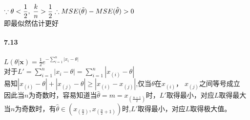 \documentclass[11pt,a4paper]{ctexart}
\newcommand{\bx}[0]{\mathbf{x}}
\begin{document}
\(\displaystyle \because \theta < \frac{1}{2} , \; \frac{k}{n} > \frac{1}{2} \\
 \therefore MSE(\tilde{\theta}) - MSE(\hat{\theta}) > 0\)\\
 即最似然估计更好
\paragraph{7.13}
\(L(\theta|\bx) = \frac{1}{2}e^{-\sum_{i = 1}^{n}|x_i - \theta|}\)\\
对于\(L' = \sum_{i = 1}^{n}|x_i - \theta| = \sum_{i = 1}^{n}|x_{(i)} - \theta|\)\\
易知\(|x_{(i)} - \theta| + |x_{(j)} - \theta| \geq |x_{(i)} - x_{(j)}|\),仅当\(\theta \text{在} x_{(i)}， \; x_{(j)}\)之间等号成立\\
因此当\(n\)为奇数时，容易知道当\(\displaystyle \hat{\theta} = m = x_{(\frac{n + 1}{2})}\)时，\(L'\)取得最小，对应\(L\)取得最大
当\(n\)为奇数时，有\(\displaystyle \hat{\theta} \in (x_{(\frac{n }{2})}, x_{(\frac{n}{2} + 1)}) \)时,\(L'\)取得最小，对应\(L\)取得极大值。
\end{document}
